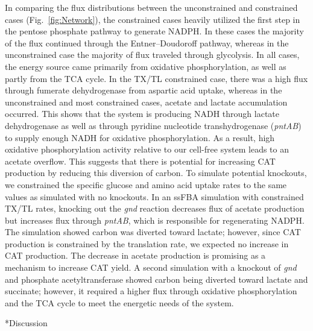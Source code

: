 \documentclass[12pt]{article}
\makeatletter
\renewcommand\section{\@startsection
	{subsection}{2}{0mm}
	{-0.2in}
	{0.05\baselineskip}
	{\normalfont\large\bfseries}}
\makeatother
\begin{document}
In comparing the flux distributions between the unconstrained and constrained cases (Fig.~\ref{fig:Network}), the constrained cases heavily utilized the first step in the pentose phosphate pathway to generate NADPH.
In these cases the majority of the flux continued through the Entner–Doudoroff pathway, whereas in the unconstrained case the majority of flux traveled through glycolysis.
In all cases, the energy source came primarily from oxidative phosphorylation, as well as partly from the TCA cycle.
In the TX/TL constrained case, there was a high flux through fumerate dehydrogenase from aspartic acid uptake, whereas in the unconstrained and most constrained cases, acetate and lactate accumulation occurred.
This shows that the system is producing NADH through lactate dehydrogenase as well as through pyridine nucleotide transhydrogenase (\textit{pntAB}) to supply enough NADH for oxidative phosphorylation.
As a result, high oxidative phosphorylation activity relative to our cell-free system leads to an acetate overflow.
This suggests that there is potential for increasing CAT production by reducing this diversion of carbon.
To simulate potential knockouts, we constrained the specific glucose and amino acid uptake rates to the same values as simulated with no knockouts.
In an ssFBA simulation with constrained TX/TL rates, knocking out the \textit{gnd} reaction decreases flux of acetate production but increases flux through \textit{pntAB}, which is responsible for regenerating NADPH.
The simulation showed carbon was diverted toward lactate; however, since CAT production is constrained by the translation rate, we expected no increase in CAT production.
The decrease in acetate production is promising as a mechanism to increase CAT yield.
A second simulation with a knockout of \textit{gnd} and phosphate acetyltransferase showed carbon being diverted toward lactate and succinate; however, it required a higher flux through oxidative phosphorylation and the TCA cycle to meet the energetic needs of the system.

\clearpage

\section*{Discussion}

\end{document}
